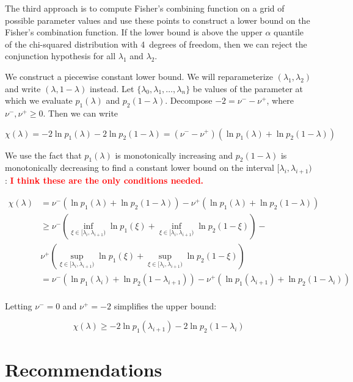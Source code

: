 \documentclass[runningheads]{llncs}
\newcommand{\beq}{\begin{equation}}
\newcommand{\eeq}{\end{equation}}
\begin{document}
The third approach is to compute Fisher's combining function on a grid of possible parameter values and use these points to construct a lower bound on the Fisher's combination function.
If the lower bound is above the upper $\alpha$ quantile of the chi-squared distribution with 4~degrees of freedom,
then we can reject the conjunction hypothesis for all $\lambda_1$ and $\lambda_2$.

We construct a piecewise constant lower bound.
We will reparameterize $(\lambda_1, \lambda_2)$ and write $(\lambda, 1-\lambda)$ instead.
Let $\{\lambda_0, \lambda_1, \dots, \lambda_n\}$ be values of the parameter at which we evaluate $p_1(\lambda)$ and $p_2(1-\lambda)$.
Decompose $-2 = \nu^- - \nu^+$, where $\nu^-, \nu^+ \ge 0$.
Then we can write

\beq
   \chi(\lambda) = -2\ln p_1(\lambda)-2\ln p_2(1-\lambda) = (\nu^- - \nu^+)\left(\ln p_1(\lambda) + \ln p_2(1-\lambda)\right)
\eeq

We use the fact that $p_1(\lambda)$ is monotonically increasing and $p_2(1-\lambda)$ is monotonically decreasing to find a constant lower bound on the interval $[\lambda_i, \lambda_{i+1})$: \textbf{\textcolor{red}{{I think these are the only conditions needed.}}}

\begin{align*}
 \chi(\lambda) &= \nu^- \left(\ln p_1(\lambda) + \ln p_2(1-\lambda)\right) - \nu^+\left(\ln p_1(\lambda) + \ln p_2(1-\lambda)\right) \\
 &\ge \nu^-   \left(\inf_{\xi \in [\lambda_i, \lambda_{i+1})}  \ln p_1(\xi) + \inf_{\xi \in [\lambda_i, \lambda_{i+1})} \ln p_2(1-\xi)\right) - \\
 &  \nu^+ \left(\sup_{\xi \in [\lambda_i, \lambda_{i+1})} \ln p_1(\xi) + \sup_{\xi \in [\lambda_i, \lambda_{i+1})} \ln p_2(1-\xi)\right) \\
 &= \nu^-   \left( \ln p_1(\lambda_i) + \ln p_2(1-\lambda_{i+1})\right) - \nu^+ \left( \ln p_1(\lambda_{i+1}) + \ln p_2(1-\lambda_i)\right) \\
\end{align*}

Letting $\nu^- = 0$ and $\nu^+ = -2$ simplifies the upper bound:

\beq
   \chi(\lambda) \ge -2 \ln p_1(\lambda_{i+1}) -2 \ln p_2(1-\lambda_i)
\eeq
  

%



\section{Recommendations} \label{sec:recommendations}
\end{document}
